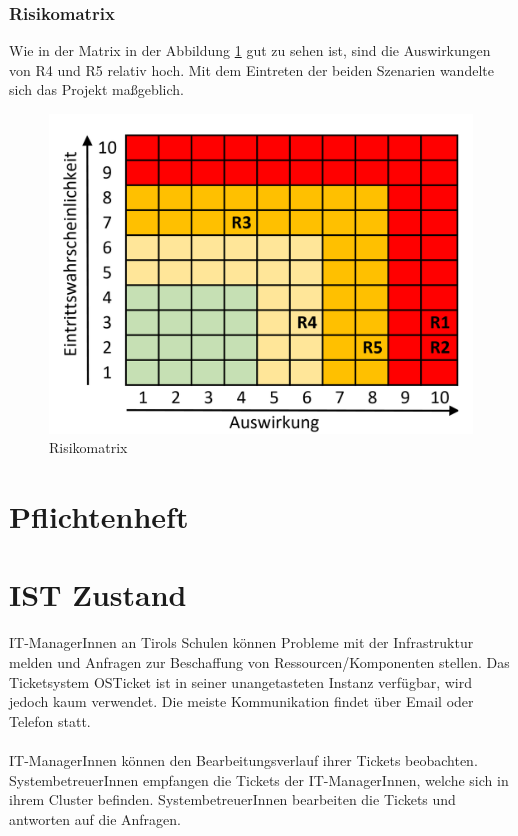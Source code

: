 \subsubsection{Risikomatrix}
Wie in der Matrix in der Abbildung \ref{Abb_Risikomatrix} gut zu sehen ist, sind die Auswirkungen von R4 und R5 relativ hoch. Mit dem Eintreten der beiden Szenarien wandelte sich das Projekt maßgeblich.
\begin{figure}[h]
	\centering
	\includegraphics[scale=.6]{figures/matrix.png}
	\caption{Risikomatrix}
	\label{Abb_Risikomatrix}
\end{figure}


\newpage
\section{Pflichtenheft}
\section{IST Zustand}
IT-ManagerInnen an Tirols Schulen können Probleme mit der Infrastruktur melden und Anfragen zur Beschaffung von Ressourcen/Komponenten stellen. Das Ticketsystem OSTicket ist in seiner unangetasteten Instanz verfügbar, wird jedoch kaum verwendet. Die meiste Kommunikation findet über Email oder Telefon statt.
\paragraph{}
IT-ManagerInnen können den Bearbeitungsverlauf ihrer Tickets beobachten. SystembetreuerInnen empfangen die Tickets der IT-ManagerInnen, welche sich in ihrem Cluster befinden. SystembetreuerInnen bearbeiten die Tickets und antworten auf die Anfragen.

